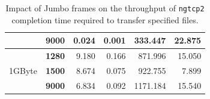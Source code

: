 \documentclass[12pt,a4paper,twoside,openright]{report}
\begin{document}
\begin{table}[H]
\begin{tabular}{|c|l|r|r|r|r|}
                                                                                & \textbf{9000}                                                                               & 0.024                     & 0.001                                                                              & 333.447                   & 22.875                                                                             \\ \hline
\multirow{3}{*}{1GByte}                                                         & \textbf{1280}                                                                               & 9.180                     & 0.166                                                                              & 871.996                   & 15.050                                                                             \\ \cline{2-6} 
                                                                                & \textbf{1500}                                                                               & 8.674                     & 0.075                                                                              & 922.755                   & 7.899                                                                              \\ \cline{2-6} 
                                                                                & \textbf{9000}                                                                               & 6.834                     & 0.092                                                                              & 1171.184                  & 15.540                                                                             \\ \hline
\end{tabular}

    \centering
    \caption[Impact of Jumbo frames for the throughput of \texttt{ngtcp2} completion time required to transfer specified files]{Impact of Jumbo frames on the throughput of \texttt{ngtcp2} completion time required to transfer specified files.}
    \label{fig:Impact_of_Jumbo_frames_for_ngtcp2_throughput}
\end{table}
  

  
\end{document}
